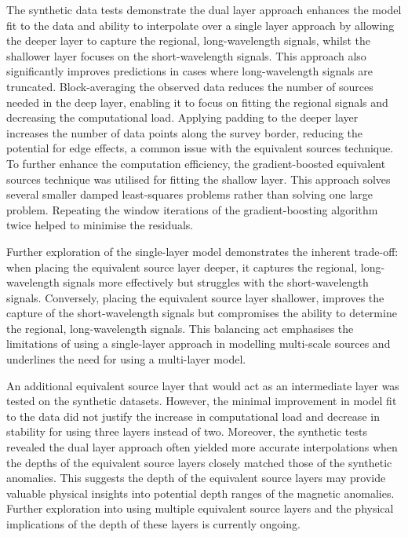 The synthetic data tests demonstrate the dual layer approach enhances the model fit to the data and ability to interpolate over a single layer approach by allowing the deeper layer to capture the regional, long-wavelength signals, whilst the shallower layer focuses on the short-wavelength signals. This approach also significantly improves predictions in cases where long-wavelength signals are truncated. Block-averaging the observed data reduces the number of sources needed in the deep layer, enabling it to focus on fitting the regional signals and decreasing the computational load. Applying padding to the deeper layer increases the number of data points along the survey border, reducing the potential for edge effects, a common issue with the equivalent sources technique. To further enhance the computation efficiency, the gradient-boosted equivalent sources technique was utilised for fitting the shallow layer. This approach solves several smaller damped least-squares problems rather than solving one large problem. Repeating the window iterations of the gradient-boosting algorithm twice helped to minimise the residuals.

Further exploration of the single-layer model demonstrates the inherent trade-off: when placing the equivalent source layer deeper, it captures the regional, long-wavelength signals more effectively but struggles with the short-wavelength signals. Conversely, placing the equivalent source layer shallower, improves the capture of the short-wavelength signals but compromises the ability to determine the regional, long-wavelength signals. This balancing act emphasises the limitations of using a single-layer approach in modelling multi-scale sources and underlines the need for using a multi-layer model.

An additional equivalent source layer that would act as an intermediate layer was tested on the synthetic datasets. However, the minimal improvement in model fit to the data did not justify the increase in computational load and decrease in stability for using three layers instead of two. Moreover, the synthetic tests revealed the dual layer approach often yielded more accurate interpolations when the depths of the equivalent source layers closely matched those of the synthetic anomalies. This suggests the depth of the equivalent source layers may provide valuable physical insights into potential depth ranges of the magnetic anomalies. Further exploration into using multiple equivalent source layers and the physical implications of the depth of these layers is currently ongoing.

